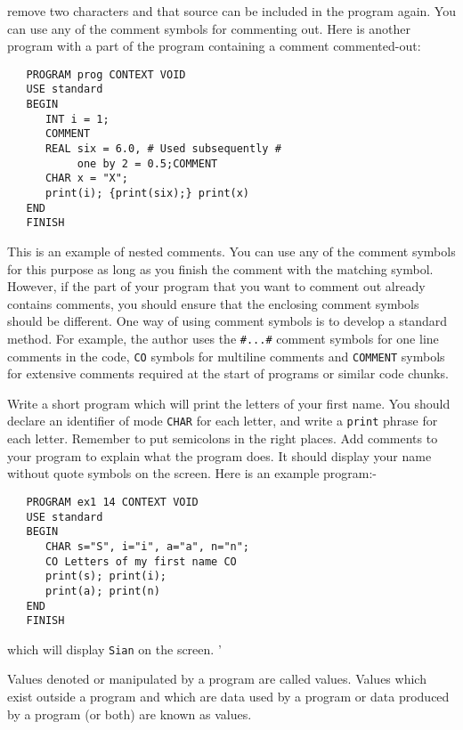 remove two characters and that source can be included in the program
again.  You can use any of the comment symbols for commenting out.
Here is another program with a part of the program containing a
comment commented-out:
\begin{verbatim}
   PROGRAM prog CONTEXT VOID
   USE standard
   BEGIN
      INT i = 1;
      COMMENT
      REAL six = 6.0, # Used subsequently #
           one by 2 = 0.5;COMMENT
      CHAR x = "X";
      print(i); {print(six);} print(x)
   END
   FINISH
\end{verbatim}
\noindent
This is an example of nested comments. You can use any of the comment
symbols for this purpose as long as you finish the comment with the
matching symbol. However, if the part of your program that you want
to comment out already contains comments, you should ensure that the
enclosing comment symbols should be different. One way of using
comment symbols is to develop a standard method. For example, the
author uses the \verb|#...#| comment symbols for one line comments in
the code, \verb|CO| symbols for multiline comments and \verb|COMMENT|
symbols for extensive comments required at the start of programs or
similar code chunks.

\begin{exercise}
\item Write a short program which will print the letters of your
first name. You should declare an identifier of mode \verb|CHAR| for
each letter, and write a \verb|print| phrase for each letter.
Remember to put semicolons in the right places. Add comments to your
program to explain what the program does. \ans It should display your
name without quote symbols on the screen.  Here is an example
program:-
\begin{verbatim}
   PROGRAM ex1 14 CONTEXT VOID
   USE standard
   BEGIN
      CHAR s="S", i="i", a="a", n="n";
      CO Letters of my first name CO
      print(s); print(i);
      print(a); print(n)
   END
   FINISH
\end{verbatim}
\noindent
which will display \verb|Sian| on the screen.
'
\end{exercise}

Values denoted or manipulated by a program are called
 values.  Values which
exist outside a program and which are data used by a program or data
produced by a program (or both) are known as
 values.

